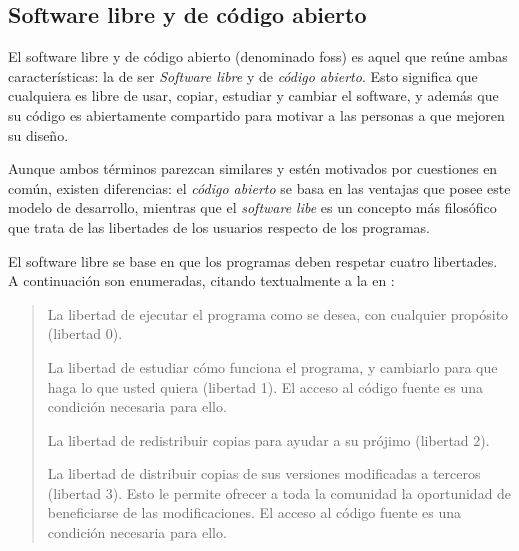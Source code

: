 \subsection{Software libre y de código abierto}
\label{software_libre_codigo_abierto}

El software libre y de código abierto (denominado \gls{foss}) es aquel que reúne ambas características: la de ser \textit{Software libre} y de \textit{código abierto}. Esto significa que cualquiera es libre de usar, copiar, estudiar y cambiar el software, y además que su código es abiertamente compartido para motivar a las personas a que mejoren su diseño\cite{gnu2017fsf}.

Aunque ambos términos parezcan similares y estén motivados por cuestiones en común, existen diferencias: el \textit{código abierto} se basa en las ventajas que posee este modelo de desarrollo, mientras que el \textit{software libe} es un concepto más filosófico que trata de las libertades de los usuarios respecto de los programas.

El software libre se base en que los programas deben respetar cuatro libertades. A continuación son enumeradas, citando textualmente a la  en \cite{libertades1996fsf}:
\blockcquote{libertades1996fsf}{
La libertad de ejecutar el programa como se desea, con cualquier propósito (libertad 0).

La libertad de estudiar cómo funciona el programa, y cambiarlo para que haga lo que usted quiera (libertad 1). El acceso al código fuente es una condición necesaria para ello.

La libertad de redistribuir copias para ayudar a su prójimo (libertad 2).

La libertad de distribuir copias de sus versiones modificadas a terceros (libertad 3). Esto le permite ofrecer a toda la comunidad la oportunidad de beneficiarse de las modificaciones. El acceso al código fuente es una condición necesaria para ello.
}

